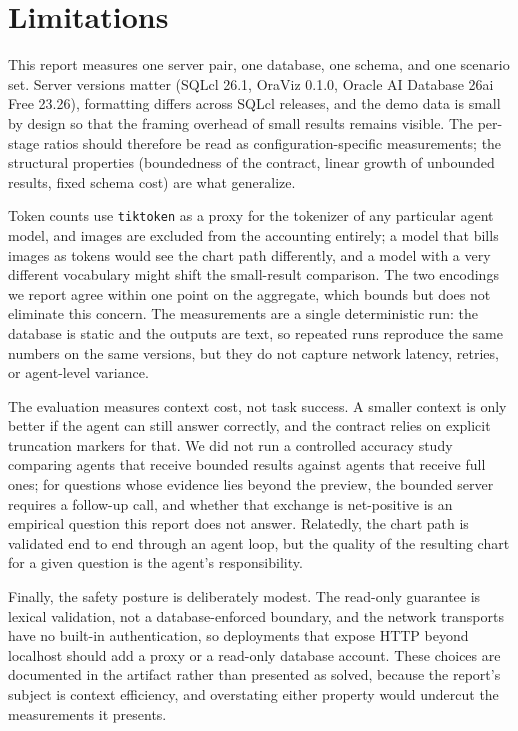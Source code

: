 \section{Limitations}\label{sec:limitations}

This report measures one server pair, one database, one schema, and one scenario set. Server versions matter (SQLcl 26.1, OraViz 0.1.0, Oracle AI Database 26ai Free 23.26), formatting differs across SQLcl releases, and the demo data is small by design so that the framing overhead of small results remains visible. The per-stage ratios should therefore be read as configuration-specific measurements; the structural properties (boundedness of the contract, linear growth of unbounded results, fixed schema cost) are what generalize.

Token counts use \texttt{tiktoken} as a proxy for the tokenizer of any particular agent model, and images are excluded from the accounting entirely; a model that bills images as tokens would see the chart path differently, and a model with a very different vocabulary might shift the small-result comparison. The two encodings we report agree within one point on the aggregate, which bounds but does not eliminate this concern. The measurements are a single deterministic run: the database is static and the outputs are text, so repeated runs reproduce the same numbers on the same versions, but they do not capture network latency, retries, or agent-level variance.

The evaluation measures context cost, not task success. A smaller context is only better if the agent can still answer correctly, and the contract relies on explicit truncation markers for that. We did not run a controlled accuracy study comparing agents that receive bounded results against agents that receive full ones; for questions whose evidence lies beyond the preview, the bounded server requires a follow-up call, and whether that exchange is net-positive is an empirical question this report does not answer. Relatedly, the chart path is validated end to end through an agent loop, but the quality of the resulting chart for a given question is the agent's responsibility.

Finally, the safety posture is deliberately modest. The read-only guarantee is lexical validation, not a database-enforced boundary, and the network transports have no built-in authentication, so deployments that expose HTTP beyond localhost should add a proxy or a read-only database account. These choices are documented in the artifact rather than presented as solved, because the report's subject is context efficiency, and overstating either property would undercut the measurements it presents.
